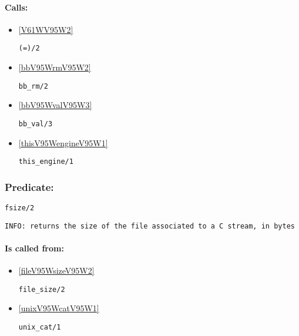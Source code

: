 \paragraph{Calls:} 
\begin{itemize}
\item \ref{V61WV95W2} 
\begin{verbatim}
(=)/2
\end{verbatim}

\item \ref{bbV95WrmV95W2} 
\begin{verbatim}
bb_rm/2
\end{verbatim}

\item \ref{bbV95WvalV95W3} 
\begin{verbatim}
bb_val/3
\end{verbatim}

\item \ref{thisV95WengineV95W1} 
\begin{verbatim}
this_engine/1
\end{verbatim}

\end{itemize}

\subsubsection{Predicate:} \label{fsizeV95W2}

\begin{verbatim}
fsize/2
\end{verbatim}

{\small \begin{verbatim}
INFO: returns the size of the file associated to a C stream, in bytes

\end{verbatim}}
\paragraph{Is called from:} 
\begin{itemize}
\item \ref{fileV95WsizeV95W2} 
\begin{verbatim}
file_size/2
\end{verbatim}

\item \ref{unixV95WcatV95W1} 
\begin{verbatim}
unix_cat/1
\end{verbatim}

\end{itemize}

